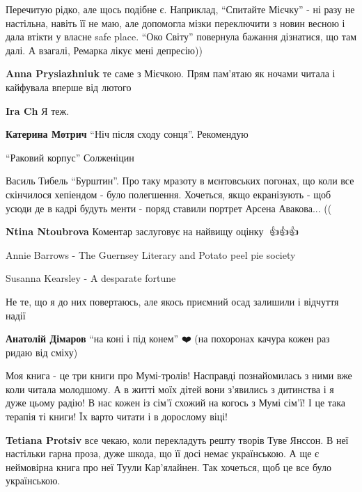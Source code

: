 
Перечитую рідко, але щось подібне є. Наприклад, \enquote{Спитайте Мієчку} - ні разу не
настільна, навіть її не маю, але допомогла мізки переключити з новин весною і
дала втікти у власне safe place. \enquote{Око Світу} повернула бажання дізнатися, що
там далі. А взагалі, Ремарка лікує мені депресію))

\begin{itemize} %
\textbf{Anna Prysiazhniuk} те саме з Мієчкою. Прям пам'ятаю як ночами читала і кайфувала вперше від лютого

\textbf{Ira Ch} Я теж.
\end{itemize} %

\textbf{Катерина Мотрич} \enquote{Ніч після сходу сонця}. Рекомендую


\enquote{Раковий корпус} Солженіцин


Василь Тибель \enquote{Бурштин}. Про таку мразоту в мєнтовських погонах, що коли все
скінчилося хепіендом - було полегшення. Хочеться, якщо екранізують - щоб усюди
де в кадрі будуть менти - поряд ставили портрет Арсена Авакова... ((

\begin{itemize} %
\textbf{Ntina Ntoubrova} Коментар заслуговує на найвищу оцінку 🤣👍👍👍
\end{itemize} %


Annie Barrows - The Guernsey Literary and Potato peel pie society

Susanna Kearsley - A desparate fortune

Не те, що я до них повертаюсь, але якось приємний осад залишили і відчуття
надії

\textbf{Анатолій Дімаров} \enquote{на коні і під конем} ❤️ (на похоронах качура кожен раз ридаю від сміху)


Моя книга - це три книги про Мумі-тролів! Насправді познайомилась з ними вже
коли читала молодшому. А в житті моїх дітей вони з'явились з дитинства і я дуже
цьому радію! В нас кожен із сім'ї схожий на когось з Мумі сім'ї! І це така
терапія ті книги! Їх варто читати і в дорослому віці!

\begin{itemize} %
\textbf{Tetiana Protsiv} все чекаю, коли перекладуть решту творів Туве Янссон. В неї настільки гарна проза, дуже шкода, що її досі немає українською. А ще є неймовірна книга про неї Туули Кар'ялайнен. Так хочеться, щоб це все було українською.
\end{itemize} %

